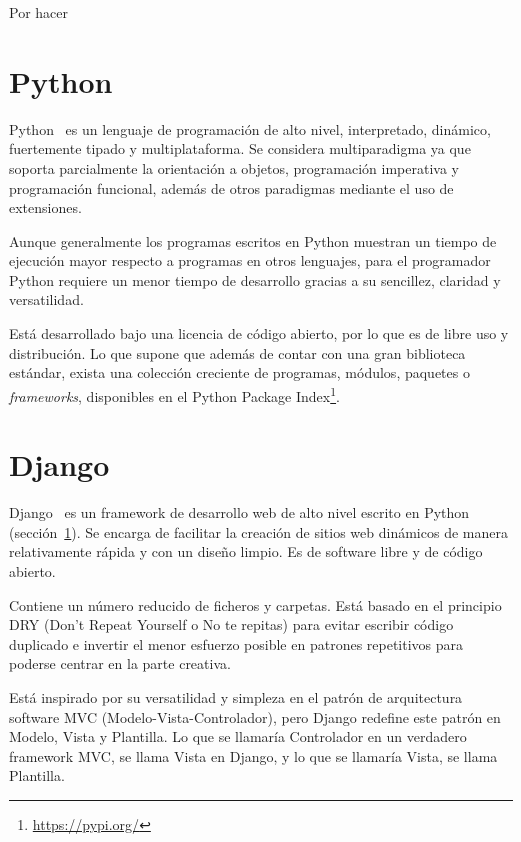 \documentclass[a4paper, 12pt]{book}
\begin{document}
Por hacer~\cite{moreno2015dr}

\section{Python}
\label{sec:python}

Python~\cite{python} es un lenguaje de programación de alto nivel, interpretado, dinámico, fuertemente tipado y multiplataforma.
Se considera multiparadigma ya que soporta parcialmente la orientación a objetos, programación imperativa y programación funcional, además de otros paradigmas mediante el uso de extensiones.

\vspace{5mm}
Aunque generalmente los programas escritos en Python muestran un tiempo de ejecución mayor respecto a programas en otros lenguajes, para el programador Python requiere un menor tiempo de desarrollo gracias a su sencillez, claridad y versatilidad.

\vspace{5mm}
Está desarrollado bajo una licencia de código abierto, por lo que es de libre uso y distribución.
Lo que supone que además de contar con una gran biblioteca estándar, exista una colección creciente de programas, módulos, paquetes o \emph{frameworks}, disponibles en el Python Package Index\footnote{\url{https://pypi.org/}}.


\section{Django}
\label{sec:django}

Django~\cite{django} es un framework de desarrollo web de alto nivel escrito en Python (sección~\ref{sec:python}).
Se encarga de facilitar la creación de sitios web dinámicos de manera relativamente rápida y con un diseño limpio.
Es de software libre y de código abierto.

\vspace{5mm}
Contiene un número reducido de ficheros y carpetas.
Está basado en el principio DRY (Don't Repeat Yourself o No te repitas) para evitar escribir código duplicado e invertir el menor esfuerzo posible en patrones repetitivos para poderse centrar en la parte creativa.

\vspace{5mm} %
Está inspirado por su versatilidad y simpleza en el patrón de arquitectura software MVC (Modelo-Vista-Controlador), pero Django redefine este patrón en Modelo, Vista y Plantilla.
Lo que se llamaría Controlador en un verdadero framework MVC, se llama Vista en Django, y lo que se llamaría Vista, se llama Plantilla.
\end{document}
